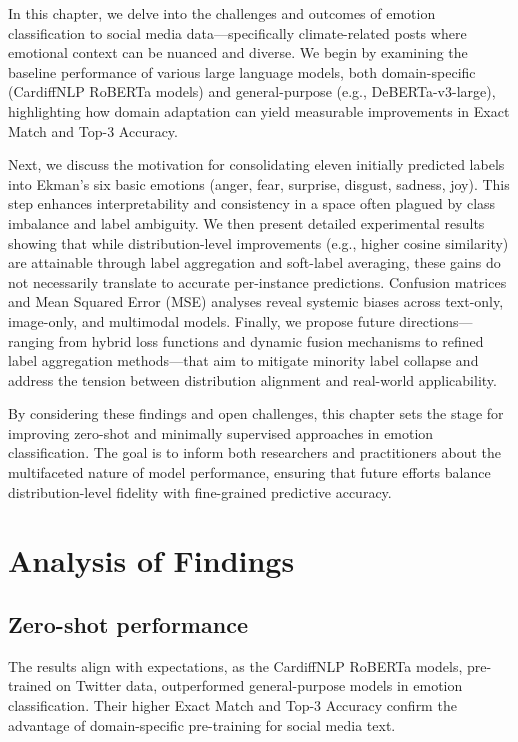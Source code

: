 In this chapter, we delve into the challenges and outcomes of emotion classification to social media data—specifically climate-related posts where emotional context can be nuanced and diverse. We begin by examining the baseline performance of various large language models, both domain-specific (CardiffNLP RoBERTa models) and general-purpose (e.g., DeBERTa-v3-large), highlighting how domain adaptation can yield measurable improvements in Exact Match and Top-3 Accuracy.
\newline

Next, we discuss the motivation for consolidating eleven initially predicted labels into Ekman’s six basic emotions (anger, fear, surprise, disgust, sadness, joy). This step enhances interpretability and consistency in a space often plagued by class imbalance and label ambiguity. We then present detailed experimental results showing that while distribution-level improvements (e.g., higher cosine similarity) are attainable through label aggregation and soft-label averaging, these gains do not necessarily translate to accurate per-instance predictions. Confusion matrices and Mean Squared Error (MSE) analyses reveal systemic biases across text-only, image-only, and multimodal models. Finally, we propose future directions—ranging from hybrid loss functions and dynamic fusion mechanisms to refined label aggregation methods—that aim to mitigate minority label collapse and address the tension between distribution alignment and real-world applicability.
\newline

By considering these findings and open challenges, this chapter sets the stage for improving zero-shot and minimally supervised approaches in emotion classification. The goal is to inform both researchers and practitioners about the multifaceted nature of model performance, ensuring that future efforts balance distribution-level fidelity with fine-grained predictive accuracy.

\section{Analysis of Findings}
\subsection{Zero-shot performance}

The results align with expectations, as the CardiffNLP RoBERTa models, pre-trained on Twitter data, outperformed general-purpose models in emotion classification. Their higher Exact Match and Top-3 Accuracy confirm the advantage of domain-specific pre-training for social media text.
\newline


